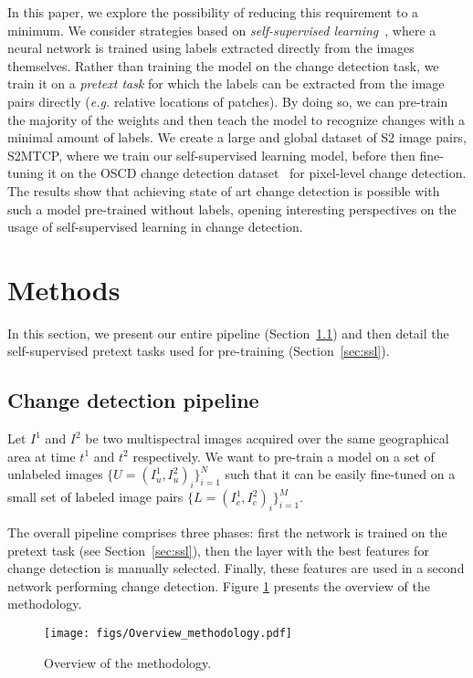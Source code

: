\documentclass[runningheads]{llncs}
\begin{document}
In this paper, we explore the possibility of reducing this requirement to a minimum. We consider strategies based on \emph{self-supervised learning}~\cite{Doersch:2015:self-supervised_spatial_context,Caron:2018:self-supervised_clustering}, where a neural network is trained using labels extracted directly from the images themselves. Rather than training the model on the change detection task, we train it on a \emph{pretext task} for which the labels can be extracted from the image pairs directly (\emph{e.g.} relative locations of patches). By doing so, we can pre-train the majority of the weights and then teach the model to recognize changes with a minimal amount of labels. We create a large and global dataset of S2 image pairs, S2MTCP, where we train our self-supervised learning model, before then fine-tuning it on the OSCD change detection dataset~\cite{Daudt:2018:OSCD_CD_dataset} for pixel-level change detection. The results show that achieving state of art change detection is possible with such a model pre-trained without labels, opening interesting perspectives on the usage of self-supervised learning in change detection.


\section{Methods}
In this section, we present our entire pipeline (Section~\ref{sec:overall}) and then detail the self-supervised pretext tasks used for pre-training (Section~\ref{sec:ssl}). 


\subsection{Change detection pipeline}\label{sec:overall}
Let $I^1$ and  $I^2$ be two multispectral images acquired over the same geographical area at time $t^1$ and $t^2$ respectively. 
We want to pre-train a model on a set of unlabeled images $\{U = (I_u^1, I_u^2)_i\}_{i=1}^{N}${ such that it can be} easily fine-tuned on a {small} set of labeled image pairs $\{L = (I_c^1, I_c^2)_i\}_{i=1}^{M}$.

The overall pipeline comprises three phases: first the network is trained on the pretext task (see Section~\ref{sec:ssl}), then the layer with the best features for change detection is manually selected. Finally, these features are used in a second network performing  change detection. Figure \ref{fig:methodology} presents the overview of the methodology. 

\begin{figure}
\texttt{[image: figs/Overview\_methodology.pdf]}
\caption{Overview of the methodology.} \label{fig:methodology}
\end{figure}
\end{document}

